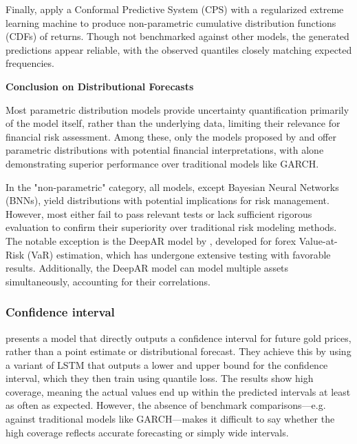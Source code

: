 Finally, \textcite{wang2020fastconformal} apply a Conformal Predictive System (CPS) with a regularized extreme learning machine to produce non-parametric cumulative distribution functions (CDFs) of returns. Though not benchmarked against other models, the generated predictions appear reliable, with the observed quantiles closely matching expected frequencies.

\textbf{Conclusion on Distributional Forecasts}

Most parametric distribution models provide uncertainty quantification primarily of the model itself, rather than the underlying data, limiting their relevance for financial risk assessment. Among these, only the models proposed by \textcite{Risk2018gpr} and \textcite{Horenko2020} offer parametric distributions with potential financial interpretations, with \textcite{Horenko2020} alone demonstrating superior performance over traditional models like GARCH.

In the "non-parametric" category, all models, except Bayesian Neural Networks (BNNs), yield distributions with potential implications for risk management. However, most either fail to pass relevant tests or lack sufficient rigorous evaluation to confirm their superiority over traditional risk modeling methods. The notable exception is the DeepAR model by \textcite{Fatouros2023DeepVaR}, developed for forex Value-at-Risk (VaR) estimation, which has undergone extensive testing with favorable results. Additionally, the DeepAR model can model multiple assets simultaneously, accounting for their correlations.

\subsubsection{Confidence interval}

\textcite{Wang2024GoldForecasting} presents a model that directly outputs a confidence interval for future gold prices, rather than a point estimate or distributional forecast. They achieve this by using a variant of LSTM that outputs a lower and upper bound for the confidence interval, which they then train using quantile loss. The results show high coverage, meaning the actual values end up within the predicted intervals at least as often as expected. However, the absence of benchmark comparisons—e.g. against traditional models like GARCH—makes it difficult to say whether the high coverage reflects accurate forecasting or simply wide intervals.



